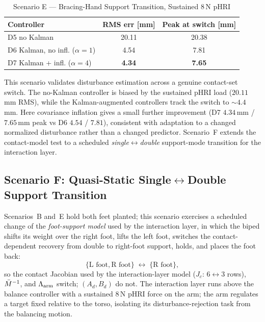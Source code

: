 \begin{table}[!t]
\caption{Scenario E --- Bracing-Hand Support Transition, Sustained 8\,N pHRI}
\label{tab:scenarioE}
\renewcommand{\arraystretch}{1.2}
\footnotesize
\begin{tabular}{@{}lcc@{}}
\toprule
\textbf{Controller} & \textbf{RMS err [mm]} & \textbf{Peak at switch [mm]} \\
\midrule
D5 no Kalman              & 20.11 & 20.38 \\
D6 Kalman, no infl. ($\alpha=1$) & 4.54 & 7.81 \\
D7 Kalman + infl. ($\alpha=4$)   & \textbf{4.34} & \textbf{7.65} \\
\bottomrule
\end{tabular}
\end{table}

This scenario validates disturbance estimation across a
genuine contact-set switch. The no-Kalman controller is biased by the sustained
pHRI load ($20.11$\,mm RMS), while the Kalman-augmented controllers track the
switch to ${\sim}4.4$\,mm. Here covariance inflation gives a small further
improvement (D7 $4.34$\,mm / $7.65$\,mm peak vs D6 $4.54$ / $7.81$),
consistent with adaptation to a changed normalized disturbance rather than a
changed predictor. Scenario~F extends the contact-model
test to a scheduled \emph{single$\leftrightarrow$double} support-mode
transition for the interaction layer.

\subsection{\texorpdfstring{Scenario F: Quasi-Static Single$\leftrightarrow$Double Support Transition}{Scenario F: Quasi-Static Single-Double Support Transition}}
\label{sec:scenarioF}
Scenarios~B and~E hold both feet planted; this scenario exercises a scheduled
change of the \emph{foot-support model} used by the interaction layer, in
which the biped shifts its weight over the right foot, lifts the left foot,
switches the contact-dependent recovery from double to right-foot support,
holds, and places the foot back:
\begin{equation*}
\{\text{L foot},\text{R foot}\}\;\longleftrightarrow\;\{\text{R foot}\},
\end{equation*}
so the contact Jacobian used by the interaction-layer model ($J_c$:
$6\leftrightarrow3$ rows), $\bar{M}^{-1}$, and $\Lambda_{\text{arm}}$ switch; $(A_d,B_d)$ do not.
The interaction layer runs above the balance controller with a sustained
$8$\,N pHRI force on the arm; the arm regulates a target fixed relative to the
torso, isolating its disturbance-rejection task from the balancing motion.

